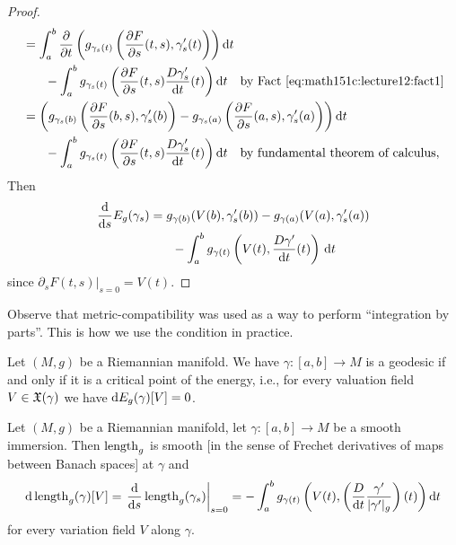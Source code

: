 \begin{proof}
\begin{subequations}
\begin{align}
&=\int^{b}_{a}\frac{\partial}{\partial t}\left(g_{\gamma_{s}(t)}\left(\frac{\partial F}{\partial s}(t,s),\gamma'_{s}(t)\right)\right)\mathrm{d} t\nonumber\\
&\phantom{=\quad}-\int^{b}_{a}g_{\gamma_{s}(t)}\left(\frac{\partial F}{\partial s}(t,s)\frac{D\gamma'_{s}}{\mathrm{d} t}(t)\right)\mathrm{d} t\quad\mbox{by Fact~\eqref{eq:math151c:lecture12:fact1}}\\
&=\left(g_{\gamma_{s}(b)}\left(\frac{\partial F}{\partial s}(b,s),\gamma'_{s}(b)\right)-
g_{\gamma_{s}(a)}\left(\frac{\partial F}{\partial s}(a,s),\gamma'_{s}(a)\right)\right)\mathrm{d} t\nonumber\\
&\phantom{=\quad}-\int^{b}_{a}g_{\gamma_{s}(t)}\left(\frac{\partial F}{\partial s}(t,s)\frac{D\gamma'_{s}}{\mathrm{d} t}(t)\right)\mathrm{d} t\quad\mbox{by fundamental theorem of calculus},
  \end{align}
\end{subequations}
Then
\begin{equation}
\begin{split}
  \frac{\D}{\D s}E_{g}(\gamma_{s})&=g_{\gamma(b)}(V(b),\gamma'_{s}(b))
  -g_{\gamma(a)}(V(a),\gamma'_{s}(a))%
  \nonumber\\
&\phantom{=\quad}-\int^{b}_{a}g_{\gamma(t)}\left(V(t),\frac{D\gamma'}{\D t}(t)\right)\,\D t
\end{split}
\end{equation}
since $\partial_{s}F(t,s)|_{s=0}=V(t)$.
\end{proof}

\begin{remark}
Observe that metric-compatibility was used as a way to perform
``integration by parts''. This is how we use the condition in practice.
\end{remark}

\begin{corollary}
Let $(M,g)$ be a Riemannian manifold. We have $\gamma\colon[a,b]\to M$
is a geodesic if and only if it is a critical point of the energy,
i.e., for every valuation field $V\in\mathfrak{X}(\gamma)$ we have $\mathrm{d} E_{g}(\gamma)[V]=0$.
\end{corollary}

\begin{theorem}
Let $(M,g)$ be a Riemannian manifold, let $\gamma\colon[a,b]\to M$ be
a smooth immersion. Then $\operatorname{length}_{g}$ is smooth [in the sense of
 Frechet derivatives of maps between Banach spaces] at $\gamma$ and
\begin{equation}
\mathrm{d}\operatorname{length}_{g}(\gamma)[V]
=\left.\frac{\mathrm{d}}{\mathrm{d} s}\operatorname{length}_{g}(\gamma_{s})\right|_{s=0}
=-\int^{b}_{a}g_{\gamma(t)}\left(V(t),\left(\frac{D}{\mathrm{d} t}\frac{\gamma'}{|\gamma'|_{g}}\right)(t)\right) \mathrm{d} t
\end{equation}
for every variation field $V$ along $\gamma$.
\end{theorem}

